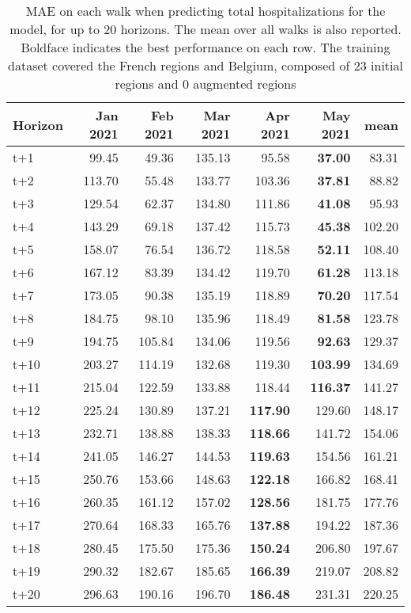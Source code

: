 \begin{table}[H]
\centering
\caption{MAE on each walk when predicting total hospitalizations for the model, for up to 20 horizons. The mean over all walks is also reported. Boldface indicates the best performance on each row. The training dataset covered the French regions and Belgium, composed of 23 initial regions and 0 augmented regions }
\label{tab:MAE_walk_assembly}
\begin{tabular}{lrrrrrr}
\toprule
Horizon &  Jan 2021 &  Feb 2021 &  Mar 2021 &  Apr 2021 &  May 2021 &   mean \\
\midrule
t+1  & 99.45  & 49.36  & 135.13  & 95.58  & \textbf{37.00}  & 83.31  \\
t+2  & 113.70  & 55.48  & 133.77  & 103.36  & \textbf{37.81}  & 88.82  \\
t+3  & 129.54  & 62.37  & 134.80  & 111.86  & \textbf{41.08}  & 95.93  \\
t+4  & 143.29  & 69.18  & 137.42  & 115.73  & \textbf{45.38}  & 102.20  \\
t+5  & 158.07  & 76.54  & 136.72  & 118.58  & \textbf{52.11}  & 108.40  \\
t+6  & 167.12  & 83.39  & 134.42  & 119.70  & \textbf{61.28}  & 113.18  \\
t+7  & 173.05  & 90.38  & 135.19  & 118.89  & \textbf{70.20}  & 117.54  \\
t+8  & 184.75  & 98.10  & 135.96  & 118.49  & \textbf{81.58}  & 123.78  \\
t+9  & 194.75  & 105.84  & 134.06  & 119.56  & \textbf{92.63}  & 129.37  \\
t+10  & 203.27  & 114.19  & 132.68  & 119.30  & \textbf{103.99}  & 134.69  \\
t+11  & 215.04  & 122.59  & 133.88  & 118.44  & \textbf{116.37}  & 141.27  \\
t+12  & 225.24  & 130.89  & 137.21  & \textbf{117.90}  & 129.60  & 148.17  \\
t+13  & 232.71  & 138.88  & 138.33  & \textbf{118.66}  & 141.72  & 154.06  \\
t+14  & 241.05  & 146.27  & 144.53  & \textbf{119.63}  & 154.56  & 161.21  \\
t+15  & 250.76  & 153.66  & 148.63  & \textbf{122.18}  & 166.82  & 168.41  \\
t+16  & 260.35  & 161.12  & 157.02  & \textbf{128.56}  & 181.75  & 177.76  \\
t+17  & 270.64  & 168.33  & 165.76  & \textbf{137.88}  & 194.22  & 187.36  \\
t+18  & 280.45  & 175.50  & 175.36  & \textbf{150.24}  & 206.80  & 197.67  \\
t+19  & 290.32  & 182.67  & 185.65  & \textbf{166.39}  & 219.07  & 208.82  \\
t+20  & 296.63  & 190.16  & 196.70  & \textbf{186.48}  & 231.31  & 220.25  \\

\bottomrule
\end{tabular}
\end{table}
